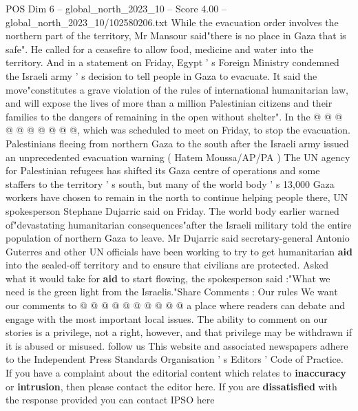 \begin{textsample}{POS Dim 6 – global\_north\_2023\_10 – Score 4.00 – global\_north\_2023\_10/102580206.txt}
While the evacuation order involves the northern part of the territory, Mr Mansour said"there is no place in Gaza that is safe".
He called for a ceasefire to allow food, medicine and water into the territory.
And in a statement on Friday, Egypt ' s Foreign Ministry condemned the Israeli army ' s decision to tell people in Gaza to evacuate.
It said the move"constitutes a grave violation of the rules of international humanitarian law, and will expose the lives of more than a million Palestinian citizens and their families to the dangers of remaining in the open without shelter".
In the @ @ @ @ @ @ @ @ @ @, which was scheduled to meet on Friday, to stop the evacuation.
Palestinians fleeing from northern Gaza to the south after the Israeli army issued an unprecedented evacuation warning ( Hatem Moussa/AP/PA ) The UN agency for Palestinian refugees has shifted its Gaza centre of operations and some staffers to the territory ' s south, but many of the world body ' s 13,000 Gaza workers have chosen to remain in the north to continue helping people there, UN spokesperson Stephane Dujarric said on Friday.
The world body earlier warned of"devastating humanitarian consequences"after the Israeli military told the entire population of northern Gaza to leave.
Mr Dujarric said secretary-general Antonio Guterres and other UN officials have been working to try to get humanitarian \textbf{aid} into the sealed-off territory and to ensure that civilians are protected.
Asked what it would take for \textbf{aid} to start flowing, the spokesperson said :"What we need is the green light from the Israelis."Share Comments : Our rules We want our comments to @ @ @ @ @ @ @ @ @ @ a place where readers can debate and engage with the most important local issues.
The ability to comment on our stories is a privilege, not a right, however, and that privilege may be withdrawn if it is abused or misused. follow us This website and associated newspapers adhere to the Independent Press Standards Organisation ' s Editors ' Code of Practice.
If you have a complaint about the editorial content which relates to \textbf{inaccuracy} or \textbf{intrusion}, then please contact the editor here.
If you are \textbf{dissatisfied} with the response provided you can contact IPSO here

\end{textsample}
